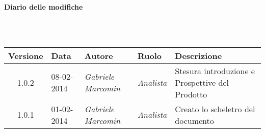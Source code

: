 \noindent\begin{Large}\textbf{Diario delle modifiche}\end{Large}\\
\\
\begin{small}
\begin{tabular}{|c|p{1.8cm}|p{2.8cm}|p{2.8cm}|p{3.5cm}|}
\hline
Versione & Data & Autore & Ruolo & Descrizione \\
\hline
\hline
1.0.2 & 08-02-2014 & 
\textit{Gabriele Marcomin} &
\textit{Analista} &  Stesura introduzione e Prospettive del Prodotto\\
\hline
\hline
1.0.1 & 01-02-2014 &
\textit{Gabriele Marcomin} &
\textit{Analista} &  Creato lo scheletro del documento\\
\hline
\end{tabular}\\
\end{small}